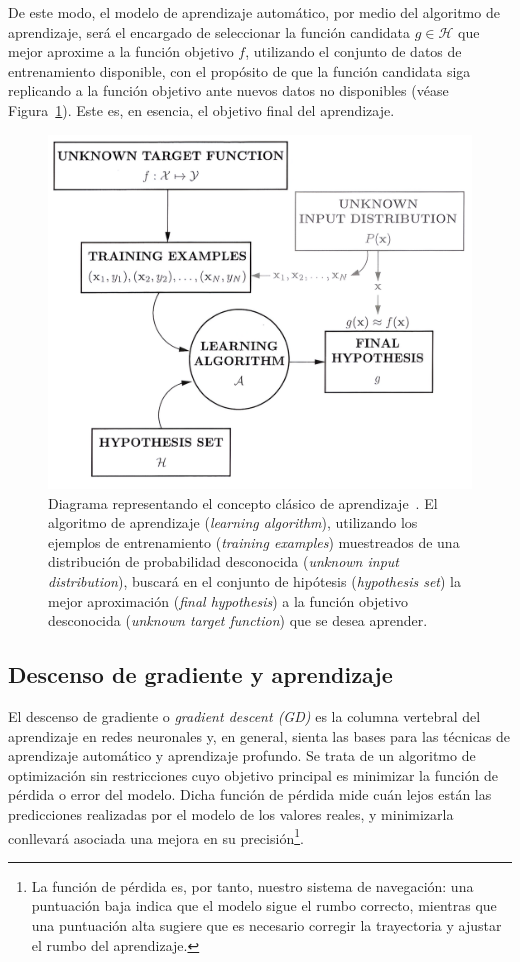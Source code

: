 De este modo, el modelo de aprendizaje automático, por medio del algoritmo de aprendizaje, será el encargado de seleccionar la función candidata $g \in \mathcal{H}$ que mejor aproxime a la función objetivo $f$, utilizando el conjunto de datos de entrenamiento disponible, con el propósito de que la función candidata siga replicando a la función objetivo ante nuevos datos no disponibles (véase Figura~\ref{fig:learning-diagram}). Este es, en esencia, el objetivo final del aprendizaje.

\begin{figure}[h]
    \centering
    \includegraphics[width=0.7\linewidth]{img/learning-diagram.png}
    \caption[Diagrama representando el concepto clásico de aprendizaje.]{Diagrama representando el concepto clásico de aprendizaje~\cite{Mostafa2012}. El algoritmo de aprendizaje (\textit{learning algorithm}), utilizando los ejemplos de entrenamiento (\textit{training examples}) muestreados de una distribución de probabilidad desconocida (\textit{unknown input distribution}), buscará en el conjunto de hipótesis (\textit{hypothesis set}) la mejor aproximación (\textit{final hypothesis}) a la función objetivo desconocida (\textit{unknown target function}) que se desea aprender.}\label{fig:learning-diagram}
\end{figure}

\subsection{Descenso de gradiente y aprendizaje}\label{subsec:descenso-gradiente}

El descenso de gradiente o \emph{gradient descent (GD)} es la columna vertebral del aprendizaje en redes neuronales y, en general, sienta las bases para las técnicas de aprendizaje automático y aprendizaje profundo. Se trata de un algoritmo de optimización sin restricciones cuyo objetivo principal es minimizar la función de pérdida o error del modelo. Dicha función de pérdida mide cuán lejos están las predicciones realizadas por el modelo de los valores reales, y minimizarla conllevará asociada una mejora en su precisión\footnote{La función de pérdida es, por tanto, nuestro sistema de navegación: una puntuación baja indica que el modelo sigue el rumbo correcto, mientras que una puntuación alta sugiere que es necesario corregir la trayectoria y ajustar el rumbo del aprendizaje.}.


